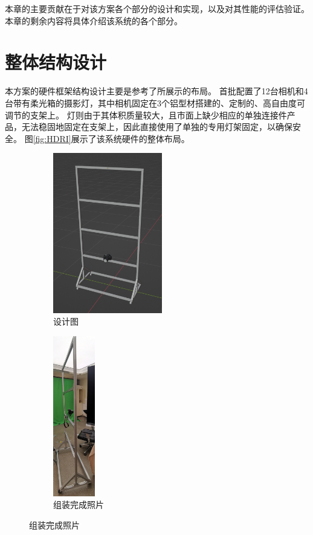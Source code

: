 本章的主要贡献在于对该方案各个部分的设计和实现，以及对其性能的评估验证。
本章的剩余内容将具体介绍该系统的各个部分。

\section{整体结构设计}

本方案的硬件框架结构设计主要是参考了\citet{RiviereGBGB20}所展示的布局。
首批配置了12台相机和4台带有柔光箱的摄影灯，其中相机固定在3个铝型材搭建的、定制的、高自由度可调节的支架上。
灯则由于其体积质量较大，且市面上缺少相应的单独连接件产品，无法稳固地固定在支架上，因此直接使用了单独的专用灯架固定，以确保安全。
图\ref{fig:HDRI}展示了该系统硬件的整体布局。

\begin{figure}
\centering
\begin{subfigure}[b]{0.3\textwidth}
    \centering
    \includegraphics[height=7cm]{figures/frame-design}
    \caption{设计图}
\end{subfigure}
\begin{subfigure}[b]{0.2\textwidth}
    \centering
    \includegraphics[height=7cm]{figures/frame-impl}
    \caption{组装完成照片}
\end{subfigure}

\end{figure}
